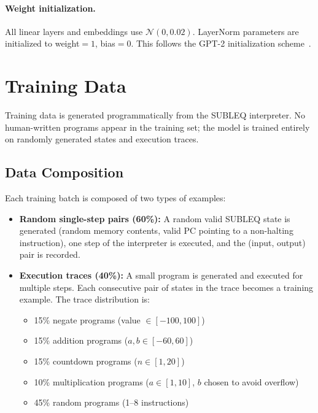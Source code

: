 \documentclass[11pt,a4paper]{article}
\begin{document}
\paragraph{Weight initialization.}
All linear layers and embeddings use $\mathcal{N}(0, 0.02)$.
LayerNorm parameters are initialized to weight${}=1$, bias${}=0$.
This follows the GPT-2 initialization scheme~\cite{radford2019gpt2}.

\section{Training Data}
\label{sec:data}

Training data is generated programmatically from the SUBLEQ interpreter.
No human-written programs appear in the training set; the model is trained entirely on randomly generated states and execution traces.

\subsection{Data Composition}

Each training batch is composed of two types of examples:

\begin{itemize}[nosep]
  \item \textbf{Random single-step pairs (60\%):} A random valid SUBLEQ state is generated (random memory contents, valid PC pointing to a non-halting instruction), one step of the interpreter is executed, and the (input, output) pair is recorded.

  \item \textbf{Execution traces (40\%):} A small program is generated and executed for multiple steps. Each consecutive pair of states in the trace becomes a training example. The trace distribution is:
  \begin{itemize}[nosep]
    \item 15\% negate programs (value $\in [-100, 100]$)
    \item 15\% addition programs ($a, b \in [-60, 60]$)
    \item 15\% countdown programs ($n \in [1, 20]$)
    \item 10\% multiplication programs ($a \in [1, 10]$, $b$ chosen to avoid overflow)
    \item 45\% random programs (1--8 instructions)
  \end{itemize}
\end{itemize}
\end{document}
